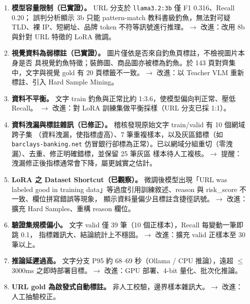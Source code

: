 \documentclass[11pt]{ctexart}
\begin{document}
\begin{enumerate}[leftmargin=1.4em]
\item \textbf{模型容量限制（已實證）。} URL 分支於 \texttt{llama3.2:3b} 僅 F1 0.316、Recall 0.20；
誤判分析顯示 3b 只能 pattern-match 教科書級釣魚，無法對可疑 TLD、裸 IP、短網址、品牌
token 不符等訊號進行推理。$\rightarrow$ 改進：改用 8b 與針對 URL 特徵的 LoRA 微調。

\item \textbf{視覺資料為弱標註（已實證）。} 圖片僅依是否來自釣魚頁標註，不檢視圖片本身是否
具視覺釣魚特徵；裝飾圖、商品圖亦被標為釣魚。於 143 頁對齊集中，文字與視覺 gold 有
20 頁標籤不一致。$\rightarrow$ 改進：以 Teacher VLM 重新標註、引入 Hard Sample Mining。

\item \textbf{資料不平衡。} 文字 train 釣魚與正常比約 1:3.6，使模型偏向判正常、壓低 Recall。
$\rightarrow$ 改進：對 LoRA 訓練集做平衡採樣（URL 分支已採 1:1）。

\item \textbf{資料洩漏與標註雜訊（已修正）。} 稽核發現原始文字 train/valid 有 10 個網域跨子集
（資料洩漏，使指標虛高）、7 筆重複樣本，以及灰區錯標（如 \texttt{barclays-banking.net}
仿冒銀行卻標為正常）。已以網域分組重切（零洩漏）、去重、修正明確錯標，並保留 25 筆灰區
樣本待人工複核。$\rightarrow$ 提醒：洩漏修正後指標通常會下降，屬更誠實之估計。

\item \textbf{LoRA 之 Dataset Shortcut（已觀察）。} 微調後模型出現「URL was labeled good in
training data」等過度引用訓練敘述、reason 與 risk\_score 不一致、欄位拼寫錯誤等現象，
顯示資料量偏少且標註含捷徑訊號。$\rightarrow$ 改進：擴充 Hard Samples、重構 reason 欄位。

\item \textbf{驗證集規模偏小。} 文字 valid 僅 39 筆（10 個正樣本），Recall 每變動一筆即跳 0.1，
指標雜訊大、結論統計上不穩固。$\rightarrow$ 改進：擴充 valid 正樣本至 30 筆以上。

\item \textbf{推論延遲過高。} 文字分支 P95 約 68--69 秒（Ollama / CPU 推論），遠超 $\le$3000ms
之即時部署目標。$\rightarrow$ 改進：GPU 部署、4-bit 量化、批次化推論。

\item \textbf{URL gold 為啟發式自動標註。} 非人工校驗，邊界樣本雜訊大。$\rightarrow$ 改進：人工抽驗校正。
\end{enumerate}

\end{document}
